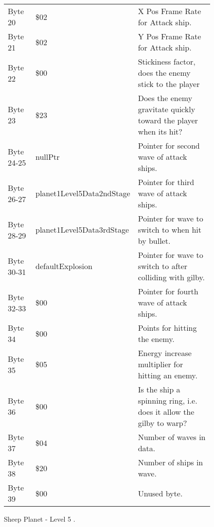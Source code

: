 \begin{figure}[H]
{\begin{adjustbox}{width=12cm}
\begin{tabular}{lll}
 Byte 20    & \$02                       & X Pos Frame Rate for Attack ship.                                   \\
 Byte 21    & \$02                       & Y Pos Frame Rate for Attack ship.                                   \\
 Byte 22    & \$00                       & Stickiness factor, does the enemy stick to the player               \\
 Byte 23    & \$23                       & Does the enemy gravitate quickly toward the player when its hit?    \\
 Byte 24-25 & nullPtr                   & Pointer for second wave of attack ships.                            \\
 Byte 26-27 & planet1Level5Data2ndStage & Pointer for third wave of attack ships.                             \\
 Byte 28-29 & planet1Level5Data3rdStage & Pointer for wave to switch to when hit by bullet.                   \\
 Byte 30-31 & defaultExplosion          & Pointer for  wave to switch to after colliding with gilby.          \\
 Byte 32-33 & \$00                       & Pointer for fourth wave of attack ships.                            \\
 Byte 34    & \$00                       & Points for hitting the enemy.                                       \\
 Byte 35    & \$05                       & Energy increase multiplier for hitting an enemy.                    \\
 Byte 36    & \$00                       & Is the ship a spinning ring, i.e. does it allow the gilby to warp?  \\
 Byte 37    & \$04                       & Number of waves in data.                                            \\
 Byte 38    & \$20                       & Number of ships in wave.                                            \\
 Byte 39    & \$00                       & Unused byte.                                                        \\
\bottomrule
\end{tabular}

  \end{adjustbox}

  }\caption*{Sheep Planet - Level 5
.}
\end{figure}

